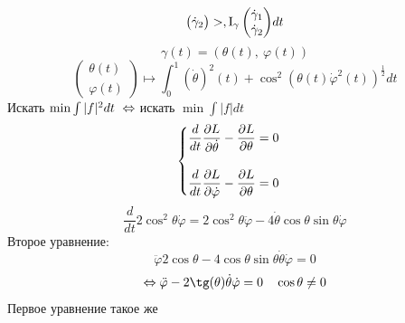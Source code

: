 \documentclass[main]{subfiles}
\begin{document}
\begin{sol}
\[{\begin{pmatrix}
            \dot{\gamma}_2
        \end{pmatrix}>, \RNumb{1}_{\gamma} \begin{pmatrix}
            \dot{\gamma}_1\\
            \dot{\gamma}_2
        \end{pmatrix}} dt\]
        \[\gamma(t) = (\theta(t),\ \varphi(t))\]
        \[\begin{pmatrix}
            \theta(t)\\
            \varphi(t)
        \end{pmatrix} \mapsto \int_0^1 (\dot{\theta})^2 (t) + \cos^2 (\theta(t) \dot{\varphi}^2 (t))^{\frac{1}{2}} dt\]
        Искать $\min \int |f|^2 dt \ \lra \ $искать $\min \int |f| dt$
        \[\begin{cases}
            \dfrac{d}{dt} \dfrac{\partial L}{\partial \dot{\theta}} - \dfrac{\partial L}{\partial \theta} = 0\\ \\
            \dfrac{d}{dt} \dfrac{\partial L}{\partial \dot{\varphi}} - \dfrac{\partial L}{\partial \theta} = 0
        \end{cases}\]
        \[\frac{d}{dt} 2 \cos^2 \theta \dot{\varphi} = 2 \cos^2 \theta \ddot{\varphi} - 4 \dot{\theta} \cos \theta \sin \theta \dot{\varphi}\]
        Второе уравнение:
        \[\ddot{\varphi} 2 \cos \theta - 4 \cos \theta \sin \theta \dot{\theta} \dot{\varphi} = 0\]
        \[\lra \ddot{\varphi} - 2 \tg(\theta) \dot{\theta} \dot{\varphi} = 0 \q \cos \theta \neq 0\]
        Первое уравнение такое же
    \end{sol}
\end{document}
